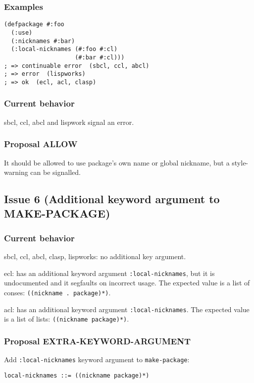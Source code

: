 \documentclass[11pt]{article}
\begin{document}
\subsubsection{Examples}
\label{sec:org9565972}
\begin{verbatim}
(defpackage #:foo
  (:use)
  (:nicknames #:bar)
  (:local-nicknames (#:foo #:cl)
                    (#:bar #:cl)))
; => continuable error  (sbcl, ccl, abcl)
; => error  (lispworks)
; => ok  (ecl, acl, clasp)
\end{verbatim}
\subsubsection{Current behavior}
\label{sec:org827e195}
sbcl, ccl, abcl and lispwork signal an error.
\subsubsection{Proposal ALLOW}
\label{sec:org7005e57}
It should be allowed to use package's own name or global nickname, but a
style-warning can be signalled.

\subsection{Issue 6 (Additional keyword argument to MAKE-PACKAGE)}
\label{sec:org6a4ca43}
\subsubsection{Current behavior}
\label{sec:orgda423c3}
sbcl, ccl, abcl, clasp, lispworks: no additional key argument.

ecl: has an additional keyword argument \texttt{:local-nicknames}, but it is undocumented
and it segfaults on incorrect usage. The expected value is a list of conses:
\texttt{((nickname . package)*)}.

acl: has an additional keyword argument \texttt{:local-nicknames}. The expected value is
a list of lists: \texttt{((nickname package)*)}.
\subsubsection{Proposal EXTRA-KEYWORD-ARGUMENT}
\label{sec:org4a27cc8}
Add \texttt{:local-nicknames} keyword argument to \texttt{make-package}:
\begin{verbatim}
local-nicknames ::= ((nickname package)*)
\end{verbatim}
\end{document}
